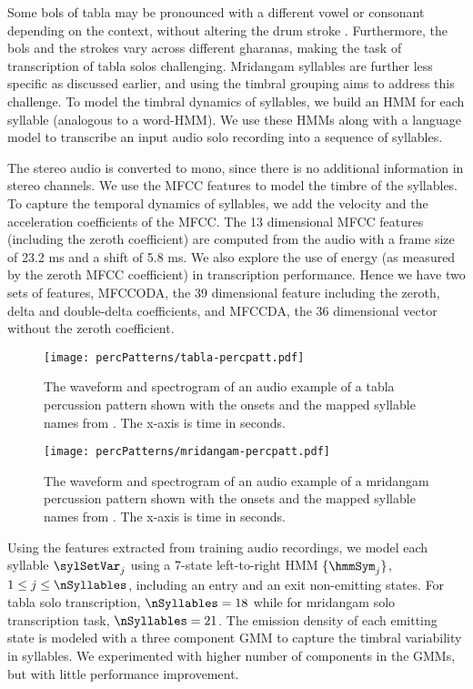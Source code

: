 Some \glspl{bol} of \gls{tabla} may be pronounced with a different vowel or consonant depending on the context, without altering the drum stroke \cite{chandola:98:ethno}. Furthermore, the \glspl{bol} and the strokes vary across different \glspl{gharana}, making the task of transcription of \gls{tabla} solos challenging. Mridangam syllables are further less specific as discussed earlier, and using the timbral grouping aims to address this challenge. To model the timbral dynamics of syllables, we build an \gls{HMM} for each syllable (analogous to a word-\gls{HMM}). We use these \glspl{HMM} along with a language model to transcribe an input audio solo recording into a sequence of syllables. 

The stereo audio is converted to mono, since there is no additional information in stereo channels. We use the \gls{MFCC} features to model the timbre of the syllables. To capture the temporal dynamics of syllables, we add the velocity and the acceleration coefficients of the \gls{MFCC}. The 13 dimensional  \gls{MFCC} features (including the zeroth coefficient) are computed from the audio with a frame size of 23.2 ms and a shift of 5.8 ms. We also explore the use of energy (as measured by the zeroth \gls{MFCC} coefficient) in transcription performance. Hence we have two sets of features, \acrshort{MFCCODA}, the 39 dimensional feature including the zeroth, delta and double-delta coefficients, and \acrshort{MFCCDA}, the 36 dimensional vector without the zeroth coefficient.
\begin{figure}
\centering
\texttt{[image: percPatterns/tabla-percpatt.pdf]}
\caption[An example of a \gls{tabla} percussion pattern]{The waveform and spectrogram of an audio example of a \gls{tabla} percussion pattern shown with the onsets and the mapped syllable names from . The x-axis is time in seconds.}
\label{fig:percpatt:tabla}
\end{figure}
% 
\begin{figure}
\centering
\texttt{[image: percPatterns/mridangam-percpatt.pdf]}
\caption[An example of a mridangam percussion pattern]{The waveform and spectrogram of an audio example of a mridangam percussion pattern shown with the onsets and the mapped syllable names from . The x-axis is time in seconds.}
\label{fig:percpatt:mridangam}
\end{figure}

Using the features extracted from training audio recordings, we model each syllable $\sylSetVar_j$ using a 7-state left-to-right \gls{HMM} $\{\hmmSym_j\}$, $1 \leq j \leq \nSyllables$, including an entry and an exit non-emitting states. For \gls{tabla} solo transcription, $\nSyllables = 18$ while for mridangam solo transcription task, $\nSyllables = 21$. The emission density of each emitting state is modeled with a three component \gls{GMM} to capture the timbral variability in syllables. We experimented with higher number of components in the \glspl{GMM}, but with little performance improvement. 

